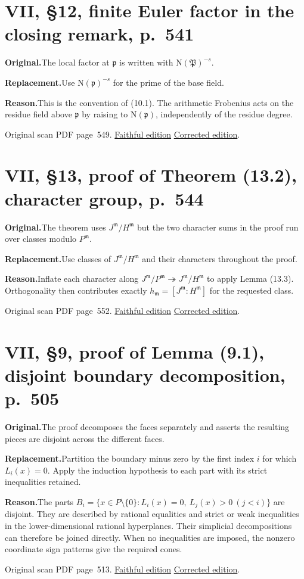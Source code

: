 \documentclass[11pt,a4paper]{article}
\newcommand{\original}{\par\smallskip\noindent\textbf{Original.}\enspace}
\newcommand{\replacement}{\par\smallskip\noindent\textbf{Replacement.}\enspace}
\newcommand{\reason}{\par\smallskip\noindent\textbf{Reason.}\enspace}
\newcommand{\editionlink}[3]{\href{#1\#errata.#2}{#3}}
\newcommand{\location}[2]{%
  \par\smallskip\noindent Original scan PDF page~#2.\enspace
  \editionlink{Neukirch_Faithful.pdf}{#1}{Faithful edition}
  \quad\editionlink{Neukirch_Corrected.pdf}{#1}{Corrected edition}.}
\begin{document}
\setcounter{section}{151}
\section{VII, \S12, finite Euler factor in the closing remark, p.~541}\label{errata:item:152}

\original The local factor at $\mathfrak p$ is written with $\mathrm N(\mathfrak P)^{-s}$.
\replacement Use $\mathrm N(\mathfrak p)^{-s}$ for the prime of the base field.
\reason This is the convention of (10.1). The arithmetic Frobenius acts on the residue field above $\mathfrak p$ by raising to $\mathrm N(\mathfrak p)$, independently of the residue degree.
\location{152}{549}

\setcounter{section}{152}
\section{VII, \S13, proof of Theorem (13.2), character group, p.~544}\label{errata:item:153}

\original The theorem uses $J^{\mathfrak m}/H^{\mathfrak m}$ but the two character sums in the proof run over classes modulo $P^{\mathfrak m}$.
\replacement Use classes of $J^{\mathfrak m}/H^{\mathfrak m}$ and their characters throughout the proof.
\reason Inflate each character along $J^{\mathfrak m}/P^{\mathfrak m}\twoheadrightarrow J^{\mathfrak m}/H^{\mathfrak m}$ to apply Lemma (13.3). Orthogonality then contributes exactly $h_{\mathfrak m}=[J^{\mathfrak m}:H^{\mathfrak m}]$ for the requested class.
\location{153}{552}

\setcounter{section}{153}
\section{VII, \S9, proof of Lemma (9.1), disjoint boundary decomposition, p.~505}\label{errata:item:154}

\original The proof decomposes the faces separately and asserts the resulting pieces are disjoint across the different faces.
\replacement Partition the boundary minus zero by the first index $i$ for which $L_i(x)=0$. Apply the induction hypothesis to each part with its strict inequalities retained.
\reason The parts $B_i=\{x\in P\setminus\{0\}:L_i(x)=0,\ L_j(x)>0\ (j<i)\}$ are disjoint. They are described by rational equalities and strict or weak inequalities in the lower-dimensional rational hyperplanes. Their simplicial decompositions can therefore be joined directly. When no inequalities are imposed, the nonzero coordinate sign patterns give the required cones.
\location{154}{513}
\end{document}
